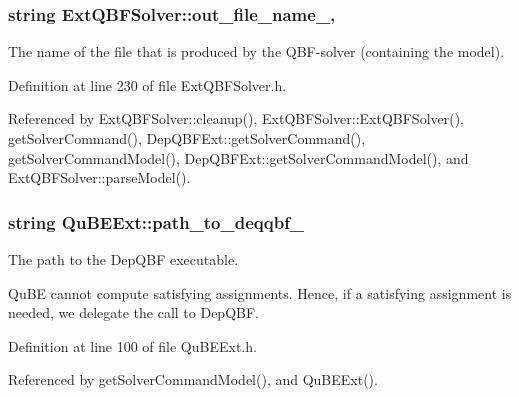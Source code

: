 \hypertarget{classExtQBFSolver_a0efb35aa9b807dec521ad3406eaf664d}{
\subsubsection[{out\-\_\-file\-\_\-name\-\_\-}]{\setlength{\rightskip}{0pt plus 5cm}string Ext\-Q\-B\-F\-Solver\-::out\-\_\-file\-\_\-name\-\_\-\hspace{0.3cm}{\ttfamily [protected]}, {\ttfamily [inherited]}}}\label{classExtQBFSolver_a0efb35aa9b807dec521ad3406eaf664d}


The name of the file that is produced by the Q\-B\-F-\/solver (containing the model). 



Definition at line 230 of file Ext\-Q\-B\-F\-Solver.\-h.



Referenced by Ext\-Q\-B\-F\-Solver\-::cleanup(), Ext\-Q\-B\-F\-Solver\-::\-Ext\-Q\-B\-F\-Solver(), get\-Solver\-Command(), Dep\-Q\-B\-F\-Ext\-::get\-Solver\-Command(), get\-Solver\-Command\-Model(), Dep\-Q\-B\-F\-Ext\-::get\-Solver\-Command\-Model(), and Ext\-Q\-B\-F\-Solver\-::parse\-Model().

\hypertarget{classQuBEExt_aed89db58647a80a6204798720ec136df}{
\subsubsection[{path\-\_\-to\-\_\-deqqbf\-\_\-}]{\setlength{\rightskip}{0pt plus 5cm}string Qu\-B\-E\-Ext\-::path\-\_\-to\-\_\-deqqbf\-\_\-\hspace{0.3cm}{\ttfamily [protected]}}}\label{classQuBEExt_aed89db58647a80a6204798720ec136df}


The path to the Dep\-Q\-B\-F executable. 

Qu\-B\-E cannot compute satisfying assignments. Hence, if a satisfying assignment is needed, we delegate the call to Dep\-Q\-B\-F. 

Definition at line 100 of file Qu\-B\-E\-Ext.\-h.



Referenced by get\-Solver\-Command\-Model(), and Qu\-B\-E\-Ext().

